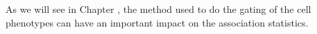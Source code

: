 As we will see in Chapter , the method used to do the gating of the cell phenotypes can have an important impact on the association
statistics.





%
%
%
%
%


%
